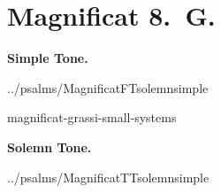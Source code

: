 {
\cleartoleftpage{}
\thispagestyle{empty}
\newcommand{\printsimpletone}{
\needspace{3\baselineskip}
\begin{center}\textbf{Simple Tone.}\end{center}
\vspace{0ex plus 0ex minus 2ex}
}
\newcommand{\printsolemntone}{
\needspace{3\baselineskip}
\begin{center}\textbf{Solemn Tone.}\end{center}
\vspace{0ex plus 0ex minus 1ex}
}

\label{magnificat-grassi}
\vspace*{-\headheight}
\section{Magnificat 8.~G.}

\def\betweenLilyPondSystem#1{
  \ifnum#1>1
    \vfil\noindent
  \else
    \linebreak
  \fi
}
\newcommand{\includelilypond}[1]{
  \noindent
  {#1}
}
\def\magsolemn{F}
\def\maggrassi{T}
\def\annot{\magtone.~\magend}
\def\greinitialformat#1{%
{\fontsize{50}{50}\selectfont #1}%
}
\def\magoddverses{}
\global\def\magtex{../psalms/Magnificat\if\magsolemn Tsolemn\else simple\fi\magtone\nostarendmag}
\printsimpletone{}
\begin{oddversesmagnificat}{\magtex}
\magoddverses
\end{oddversesmagnificat}

\includelilypond{magnificat-grassi-small-systems}



\def\magsolemn{T}
\let\magant=\undefined
\let\magantlinetwo=\undefined
\let\magtex=\undefined
\let\magverses=\undefined
{}
\def\annot{\magtone.~\magend}
\global\def\magtex{../psalms/Magnificat\if\magsolemn Tsolemn\else simple\fi\magtone\nostarendmag}
\printsolemntone{}
\begin{oddversesmagnificat}{\magtex}
\magoddverses
\end{oddversesmagnificat}
}